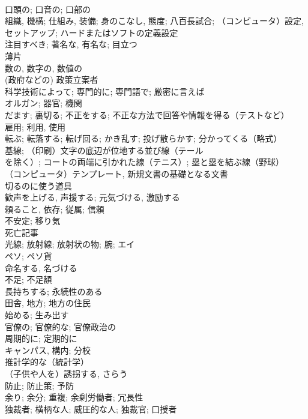 \documentclass[8pt]{extreport}
\begin{document}
\begin{CJK}{UTF8}{min}
\\	口頭の; 口音の; 口部の	
\\	組織, 機構; 仕組み, 装備; 身のこなし, 態度; 八百長試合; （コンピュータ）設定, セットアップ; ハードまたはソフトの定義設定	
\\	注目すべき; 著名な, 有名な; 目立つ	
\\	薄片	
\\	数の, 数字の, 数値の	
\\	(政府などの) 政策立案者	
\\	科学技術によって; 専門的に; 専門語で; 厳密に言えば	
\\	オルガン; 器官; 機関	
\\	だます; 裏切る; 不正をする; 不正な方法で回答や情報を得る（テストなど）	
\\	雇用; 利用, 使用	
\\	転ぶ; 転落する; 転げ回る; かき乱す; 投げ散らかす; 分かってくる（略式）	
\\	基線; （印刷）文字の底辺が位地する並び線（テール 
\\	を除く）; コートの両端に引かれた線（テニス）; 塁と塁を結ぶ線（野球）	
\\	（コンピュータ）テンプレート, 新規文書の基礎となる文書 
\\	切るのに使う道具	
\\	歓声を上げる, 声援する; 元気づける, 激励する	
\\	頼ること, 依存; 従属; 信頼	
\\	不安定; 移り気	
\\	死亡記事
\\	光線; 放射線; 放射状の物; 腕; エイ	
\\	ペソ; ペソ貨	
\\	命名する, 名づける	
\\	不足; 不足額	
\\	長持ちする; 永続性のある	
\\	田舎, 地方; 地方の住民	
\\	始める; 生み出す	
\\	官僚の; 官僚的な; 官僚政治の	
\\	周期的に; 定期的に
\\	キャンパス, 構内; 分校	
\\	推計学的な（統計学）	
\\	（子供や人を）誘拐する, さらう	
\\	防止; 防止策; 予防	
\\	余り; 余分; 重複; 余剰労働者; 冗長性	
\\	独裁者; 横柄な人; 威圧的な人; 独裁官; 口授者	

\end{CJK}
\end{document}
